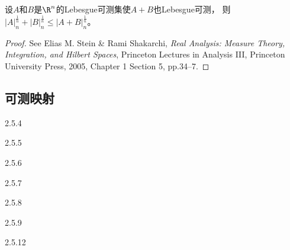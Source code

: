 \begin{12}
    设$A$和$B$是$\R^n$的Lebesgue可测集使$A+B$也Lebesgue可测，
    则$|A|_n^\frac{1}{n}+|B|_n^\frac{1}{n}\leqslant|A+B|_n^\frac{1}{n}$。
\end{12}
\begin{proof}
    See Elias M. Stein \& Rami Shakarchi, \textit{Real Analysis: Measure Theory, Integration, and Hilbert Spaces}, 
    Princeton Lectures in Analysis III, Princeton University Press, 2005, Chapter 1 Section 5, pp.34--7.
\end{proof}


\subsection{可测映射}
  {2.5.4}

   
\begin{solution}

\end{solution}



  {2.5.5}

   
\begin{solution}

\end{solution}


  {2.5.6}

   
\begin{solution}

\end{solution}


  {2.5.7}

   
\begin{solution}

\end{solution}


  {2.5.8}

   
\begin{solution}

\end{solution}


  {2.5.9}

   
\begin{solution}

\end{solution}


  {2.5.12}

   
\begin{solution}

\end{solution}



